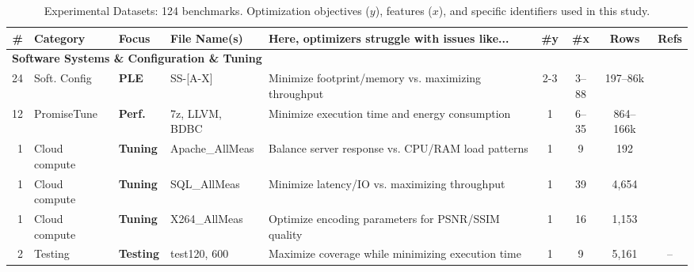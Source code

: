 \begin{table}[!t] 
{\fontsize{9}{10}\selectfont %
\centering
\setlength{\tabcolsep}{2.5pt} 
\renewcommand{\arraystretch}{1.1} 

\caption{Experimental Datasets: 124 benchmarks. Optimization objectives ($y$), features ($x$), and specific identifiers used in this study.}\label{mootdata}

\begin{tabularx}{\textwidth}{@{} r |  l l l X c | c | c | c @{}} 
\rowcolor{blue!15} 
\textbf{\#} & \textbf{Category} & \textbf{Focus} & \textbf{File Name(s)} & \textbf{Here, optimizers struggle with issues like...} & \textbf{\#y} & \textbf{\#x} & \textbf{Rows} & \textbf{Refs} \\ \midrule

\multicolumn{9}{l}{\cellcolor{gray!30}\textbf{Software Systems \& Configuration \& Tuning}} \\
24 & Soft. Config & \textbf{PLE} & SS-[A-X] & Minimize footprint/memory vs. maximizing throughput & 2-3 & 3--88 & 197–86k & \cite{Amiraliminimaldata} \\ \rowcolor{gray!10}
12 & PromiseTune & \textbf{Perf.} & 7z, LLVM, BDBC & Minimize execution time and energy consumption & 1 & 6--35 & 864–166k & \cite{chen2026promisetune} \\ 
1 & Cloud compute& \textbf{Tuning} & Apache\_AllMeas & Balance server response vs. CPU/RAM load patterns & 1 & 9 & 192 & \cite{senthilkumar2024can} \\ \rowcolor{gray!10}
1 & Cloud  compute& \textbf{Tuning} & SQL\_AllMeas & Minimize latency/IO vs. maximizing throughput & 1 & 39 & 4,654 & \cite{chen2025accuracy} \\ 
1 & Cloud compute & \textbf{Tuning} & X264\_AllMeas & Optimize encoding parameters for PSNR/SSIM quality & 1 & 16 & 1,153 & \cite{Amiraliminimaldata} \\ \rowcolor{gray!10}
2 & Testing & \textbf{Testing} & test120, 600 & Maximize coverage while minimizing execution time & 1 & 9 & 5,161 & -- \\ \midrule


\end{tabularx}}
\end{table}
